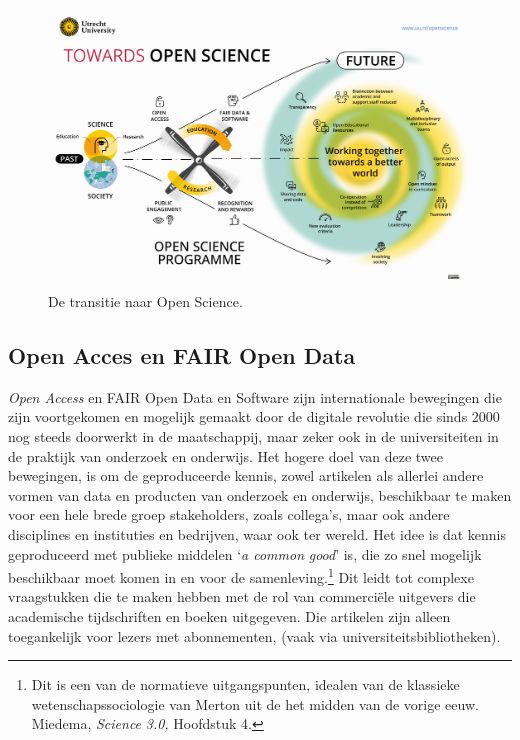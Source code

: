 \documentclass[smallauthor, chapterhaspagenum, nochapterinheader, pagenuminheader,  bigchapnum,medium2, tocpages, garamond, titleinheader]{jote-book}
\begin{document}
	\begin{figure}
		\includegraphics[width=\linewidth]{media/image1.png}



		\label{fig:rId12}



		\caption{De transitie naar Open Science.}
	\end{figure}



	\subsection{Open Acces en FAIR Open Data}



	\emph{Open Access} en FAIR Open Data en Software zijn internationale bewegingen die zijn voortgekomen en mogelijk gemaakt door de digitale revolutie die sinds 2000 nog steeds doorwerkt in de maatschappij, maar zeker ook in de universiteiten in de praktijk van onderzoek en onderwijs. Het hogere doel van deze twee bewegingen, is om de geproduceerde kennis, zowel artikelen als allerlei andere vormen van data en producten van onderzoek en onderwijs, beschikbaar te maken voor een hele brede groep stakeholders, zoals collega's, maar ook andere disciplines en instituties en bedrijven, waar ook ter wereld. Het idee is dat kennis geproduceerd met publieke middelen ‘\emph{a common }\emph{good}' is, die zo snel mogelijk beschikbaar moet komen in en voor de samenleving.\footnote{Dit is een van de normatieve uitgangspunten, idealen van de klassieke wetenschapssociologie van Merton uit de het midden van de vorige eeuw. Miedema, \emph{Science}\emph{ 3.0}\emph{, }Hoofdstuk 4.} Dit leidt tot complexe vraagstukken die te maken hebben met de rol van commerciële uitgevers die academische tijdschriften en boeken uitgegeven. Die artikelen zijn alleen toegankelijk voor lezers met abonnementen, (vaak via universiteitsbibliotheken).
\end{document}
